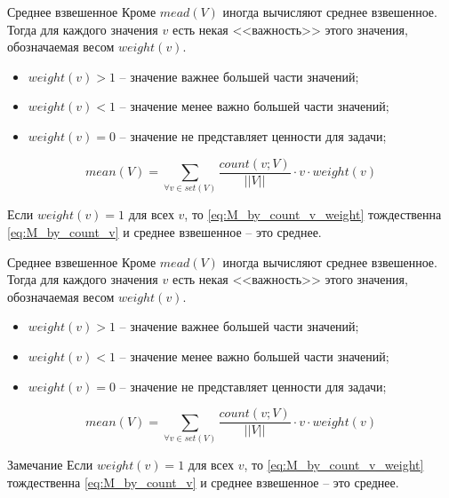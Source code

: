 \begin{frame}{Среднее взвешенное}
	Кроме $mead(V)$ иногда вычисляют среднее взвешенное.
	Тогда для каждого значения $v$ есть некая <<важность>> этого значения, 
	обозначаемая весом $weight(v)$.
	
	\begin{itemize}
		\item $weight(v)>1$ -- значение важнее большей части значений;
		\item $weight(v)<1$ -- значение менее важно большей части значений;
		\item $weight(v)=0$ -- значение не представляет ценности для задачи;
	\end{itemize}

	\begin{equation}\label{eq:M_by_count_v_weight}
	mean(V) = \sum_{\forall v \in set(V)} \frac{count(v;V)}{||V||} \cdot v \cdot weight(v)
	\end{equation}

	Если $weight(v) = 1$ для всех $v$, то 
	\eqref{eq:M_by_count_v_weight} тождественна \eqref{eq:M_by_count_v}
	и среднее взвешенное -- это среднее.
	
\end{frame}

\begin{frame}{Среднее взвешенное}
	\footnotesize
	Кроме $mead(V)$ иногда вычисляют среднее взвешенное.
	Тогда для каждого значения $v$ есть некая <<важность>> этого значения, 
	обозначаемая весом $weight(v)$.
	
	\begin{itemize}
		\item $weight(v)>1$ -- значение важнее большей части значений;
		\item $weight(v)<1$ -- значение менее важно большей части значений;
		\item $weight(v)=0$ -- значение не представляет ценности для задачи;
	\end{itemize}
	
	\begin{equation}\label{eq:M_by_count_v_weight}
	mean(V) = \sum_{\forall v \in set(V)} \frac{count(v;V)}{||V||} \cdot v \cdot weight(v)
	\end{equation}
	
	\begin{block}{Замечание}
	Если $weight(v) = 1$ для всех $v$, то 
	\eqref{eq:M_by_count_v_weight} тождественна \eqref{eq:M_by_count_v}
	и среднее взвешенное -- это среднее.
	\end{block}
	
	
\end{frame}

